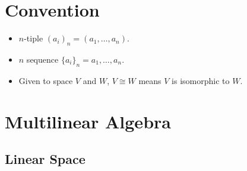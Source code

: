 
\section{Convention}
\begin{itemize}
\item $n$-tiple $(a_i)_n = (a_1,\dots,a_n)$.
\item $n$ sequence $\{a_i\}_n=a_1,\dots,a_n$.
\item Given to space $V$ and $W$, $V\cong W$ means $V$ is isomorphic to $W$.
\end{itemize}

\section{Multilinear Algebra}

\subsection{Linear Space}
